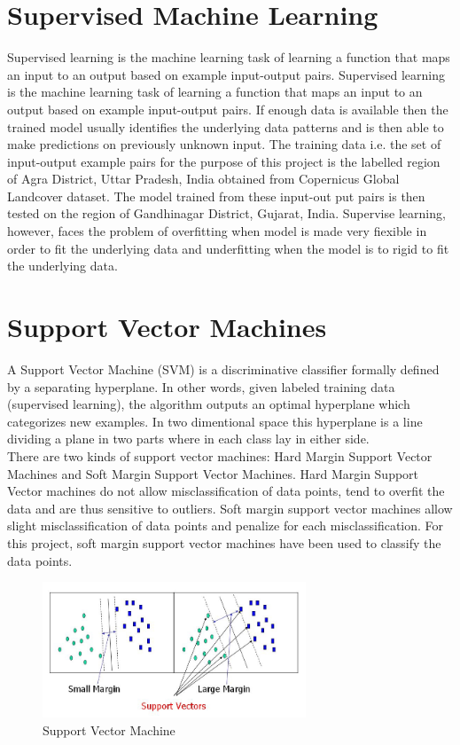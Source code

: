 \documentclass[12pt, a4paper]{report}
\begin{document}
\section{Supervised Machine Learning}
Supervised learning is the machine learning task of learning a function that maps an input to an output based on example input-output pairs.\cite{supervisedlearningone} Supervised learning is the machine learning task of learning a function that maps an input to an output based on example input-output pairs.\cite{supervisedlearningtwo} If enough data is available then the trained model usually identifies the underlying data patterns and is then able to make predictions on previously unknown input. The training data i.e. the set of input-output example pairs for the purpose of this project is the labelled region of Agra District, Uttar Pradesh, India obtained from Copernicus Global Landcover dataset. The model trained from these input-out put pairs is then tested on the region of Gandhinagar District, Gujarat, India. Supervise learning, however, faces the problem of overfitting when model is made very fiexible in order to fit the underlying data and underfitting when the model is to rigid to fit the underlying data.
\section{Support Vector Machines}
A Support Vector Machine (SVM) is a discriminative classifier formally defined by a separating hyperplane. In other words, given labeled training data (supervised learning), the algorithm outputs an optimal hyperplane which categorizes new examples. In two dimentional space this hyperplane is a line dividing a plane in two parts where in each class lay in either side.\cite{supportvectormachines}\\
There are two kinds of support vector machines: Hard Margin Support Vector Machines and Soft Margin Support Vector Machines.
Hard Margin Support Vector machines do not allow misclassification of data points, tend to overfit the data and are thus sensitive to outliers. Soft margin support vector machines allow slight misclassification of data points and penalize for each misclassification.
For this project, soft margin support vector machines have been used to classify the data points.

\begin{figure}[h]
\centering
\includegraphics[width=0.7\textwidth]{supportvectormachines.jpg}
\caption{Support Vector Machine}
\end{figure}
\end{document}
